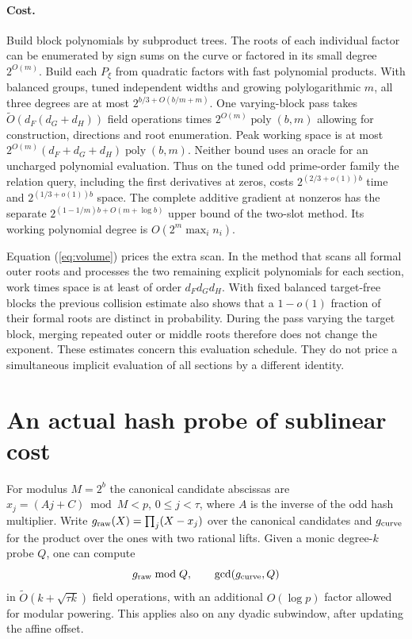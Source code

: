\documentclass[11pt]{article}
\newcommand{\wtO}{\widetilde O}
\begin{document}
\paragraph{Cost.}
Build block polynomials by subproduct trees. The roots of each
individual factor can be enumerated by sign sums on the curve or
factored in its small degree $2^{O(m)}$. Build each $P_\xi$ from
quadratic factors with fast polynomial products. With balanced
groups, tuned independent widths and growing polylogarithmic $m$,
all three degrees are at most $2^{b/3+O(b/m+m)}$. One varying-block
pass takes $\wtO(d_F(d_G+d_H))$ field operations times
$2^{O(m)}\operatorname{poly}(b,m)$ allowing for construction,
directions and root enumeration. Peak working space is at most
$2^{O(m)}(d_F+d_G+d_H)\operatorname{poly}(b,m)$. Neither bound
uses an oracle for an uncharged polynomial evaluation.
Thus on the tuned odd prime-order family the relation query, including the first derivatives at zeros,
costs $2^{(2/3+o(1))b}$ time and $2^{(1/3+o(1))b}$ space.
The complete additive gradient at nonzeros has the separate
$2^{(1-1/m)b+O(m+\log b)}$ upper bound of the two-slot method.
Its working polynomial degree is $O(2^m\max_i n_i)$.

Equation (\ref{eq:volume}) prices the extra scan. In the method
that scans all formal outer roots and processes the two remaining
explicit polynomials for each section, work times space is at
least of order $d_Fd_Gd_H$. With fixed balanced target-free blocks
the previous collision estimate also shows that a $1-o(1)$ fraction
of their formal roots are distinct in probability. During the pass
varying the target block, merging repeated outer or middle roots
therefore does not change the exponent. These estimates concern
this evaluation schedule. They do not price a simultaneous
implicit evaluation of all sections by a different identity.

\section{An actual hash probe of sublinear cost}
For modulus $M=2^b$ the canonical candidate abscissas are
$x_j=(A j+C)\bmod M<p$, $0\le j<\tau$, where $A$ is the inverse
of the odd hash multiplier. Write $g_{\rm raw}(X)=\prod_j(X-x_j)$
over the canonical candidates and $g_{\rm curve}$ for the product
over the ones with two rational lifts. Given a monic degree-$k$
probe $Q$, one can compute
\[
   g_{\rm raw}\bmod Q,\qquad \gcd(g_{\rm curve},Q)
\]
in $\wtO(k+\sqrt{\tau k})$ field operations, with an additional
$O(\log p)$ factor allowed for modular powering. This applies
also on any dyadic subwindow, after updating the affine offset.
\end{document}
